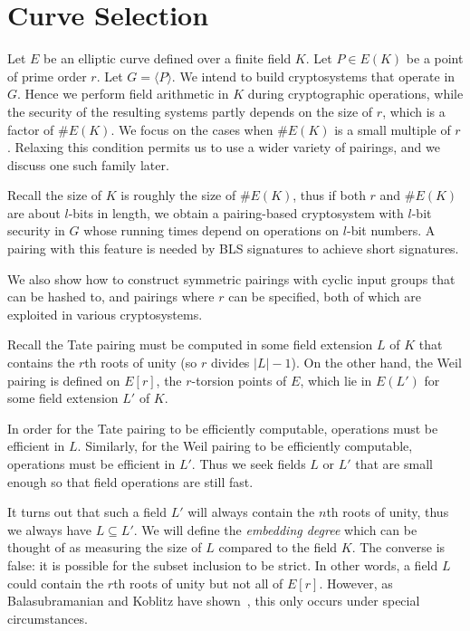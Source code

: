 \chapter{Curve Selection}

Let $E$ be an elliptic curve defined over a finite field $K$.
Let $P \in E(K)$ be a point of prime order $r$. Let $G = \langle P \rangle$.
We intend to build cryptosystems that operate in $G$. Hence
we perform field arithmetic in $K$ during cryptographic operations,
while the security of the resulting systems partly depends on the size of $r$,
which is a factor of $\#E(K)$.
We focus on the cases when $\#E(K)$ is a small multiple of $r$.
Relaxing this condition permits us to use a wider variety of pairings, and we
discuss one such family later.

Recall the size of $K$ is roughly the size of $\#E(K)$,
thus if both $r$ and $\#E(K)$ are about $l$-bits in length,
we obtain a pairing-based cryptosystem with $l$-bit security
in $G$ whose running times depend on operations on $l$-bit numbers.
A pairing with this feature is needed by BLS signatures to
achieve short signatures.

We also show how to construct symmetric pairings with cyclic input groups that
can be hashed to, and pairings where $r$ can be specified, both of which are
exploited in various cryptosystems.

Recall the Tate pairing must be computed in some field extension $L$ of $K$
that contains the $r$th roots of unity (so $r$ divides $|L| - 1$). On the other
hand, the Weil pairing is defined on $E[r]$, the $r$-torsion points of $E$,
which lie in $E(L')$ for some field extension $L'$ of $K$.

In order for the Tate pairing to be efficiently computable, operations must be
efficient in $L$. Similarly, for the Weil pairing to be efficiently computable,
operations must be efficient in $L'$. Thus we seek fields $L$ or $L'$ that are
small enough so that field operations are still fast.

It turns out that such a field $L'$ will always contain the $n$th
roots of unity, thus we always have $L \subseteq L'$.
We will define the \emph{embedding degree} which can be thought of as measuring
the size of $L$ compared to the field $K$.
The converse is false: it is possible for the subset inclusion to be strict.
In other words,
a field $L$ could contain the $r$th roots of unity but not all of $E[r]$.
However, as Balasubramanian and Koblitz have shown~\cite{bk},
this only occurs under special circumstances.

